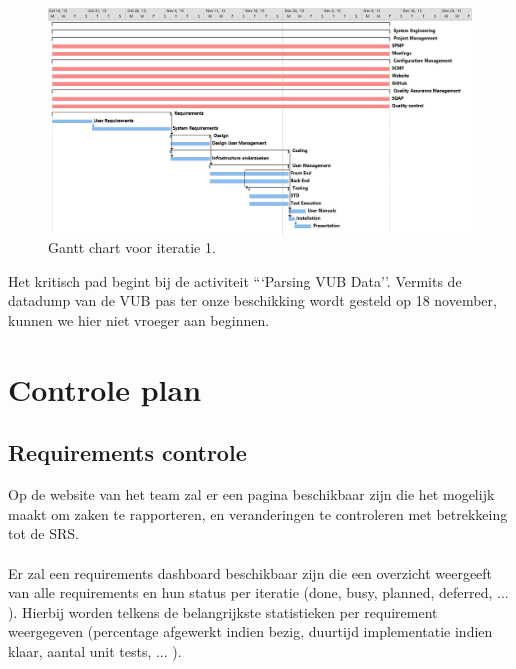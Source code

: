 \begin{figure} [H]
	\centering
	\includegraphics[width = \textwidth]{ManagerialProcess/GanttChartIT1.png}	
	\caption{Gantt chart voor iteratie 1.}
	\label{fig:GantChartIT1}
\end{figure}
Het kritisch pad begint bij de activiteit ```Parsing VUB Data''.  Vermits de datadump van de VUB pas ter onze beschikking wordt gesteld op 18 november, kunnen we hier niet vroeger aan beginnen.

\section{Controle plan}
\subsection{Requirements controle} \label{RequirementsControlPlan}
Op de website van het team \cite{portalWebsite} zal er een pagina beschikbaar zijn die het mogelijk maakt om zaken te rapporteren, en veranderingen te controleren met betrekkeing tot de SRS.
\\
\\
Er zal een requirements dashboard beschikbaar zijn die een overzicht weergeeft van alle requirements en hun status per iteratie (done, busy, planned, deferred, ... ). Hierbij worden telkens de belangrijkste statistieken per requirement weergegeven (percentage afgewerkt indien bezig, duurtijd implementatie indien klaar, aantal unit tests, ... ).


